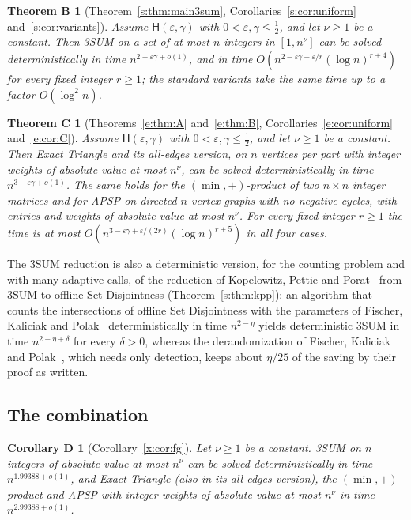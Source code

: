 \documentclass[11pt]{article}
\newtheorem*{theoremB}{Theorem B}
\newtheorem*{theoremC}{Theorem C}
\newtheorem*{corollaryD}{Corollary D}
\theoremstyle{definition}
\theoremstyle{remark}
\newcommand{\Hyp}{\mathsf{H}}
\newcommand{\ExpThreeSumBest}{1.99388}%
\newcommand{\ExpAPSPBest}{2.99388}%
\begin{document}
\label{m:introB}\begin{theoremB}[Theorem~\ref{s:thm:main3sum}, Corollaries~\ref{s:cor:uniform} and~\ref{s:cor:variants}]
Assume $\Hyp(\varepsilon,\gamma)$ with $0<\varepsilon,\gamma\le\frac12$, and let $\nu\ge1$ be a constant. Then 3SUM on a set of at most $n$ integers in $[1,n^\nu]$ can be solved deterministically in time $n^{2-\varepsilon\gamma+o(1)}$, and in time $O(n^{2-\varepsilon\gamma+\varepsilon/r}(\log n)^{r+4})$ for every fixed integer $r\ge1$; the standard variants take the same time up to a factor $O(\log^2n)$.
\end{theoremB}

\label{m:introC}\begin{theoremC}[Theorems~\ref{e:thm:A} and~\ref{e:thm:B}, Corollaries~\ref{e:cor:uniform} and~\ref{e:cor:C}]
Assume $\Hyp(\varepsilon,\gamma)$ with $0<\varepsilon,\gamma\le\frac12$, and let $\nu\ge1$ be a constant. Then Exact Triangle and its all-edges version, on $n$ vertices per part with integer weights of absolute value at most $n^\nu$, can be solved deterministically in time $n^{3-\varepsilon\gamma+o(1)}$. The same holds for the $(\min,+)$-product of two $n\times n$ integer matrices and for APSP on directed $n$-vertex graphs with no negative cycles, with entries and weights of absolute value at most $n^\nu$. For every fixed integer $r\ge1$ the time is at most $O(n^{3-\varepsilon\gamma+\varepsilon/(2r)}(\log n)^{r+5})$ in all four cases.
\end{theoremC}

The 3SUM reduction is also a deterministic version, for the counting problem and with many adaptive calls, of the reduction of Kopelowitz, Pettie and Porat~\cite{KPP16} from 3SUM to offline Set Disjointness (Theorem~\ref{s:thm:kpp}): an algorithm that counts the intersections of offline Set Disjointness with the parameters of Fischer, Kaliciak and Polak~\cite{FKP24} deterministically in time $n^{2-\eta}$ yields deterministic 3SUM in time $n^{2-\eta+\delta}$ for every $\delta>0$, whereas the derandomization of Fischer, Kaliciak and Polak~\cite{FKP24}, which needs only detection, keeps about $\eta/25$ of the saving by their proof as written.

\subsection{The combination}\label{m:sec:intro:comb}

\label{m:introD}\begin{corollaryD}[Corollary~\ref{x:cor:fg}]
Let $\nu\ge1$ be a constant. %
3SUM on $n$ integers of absolute value at most $n^\nu$ can be solved deterministically in time $n^{\ExpThreeSumBest+o(1)}$, and Exact Triangle (also in its all-edges version), the $(\min,+)$-product and APSP with integer weights of absolute value at most $n^\nu$ in time $n^{\ExpAPSPBest+o(1)}$.
\end{corollaryD}
\end{document}

